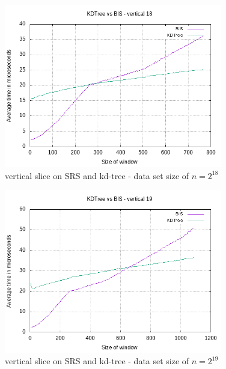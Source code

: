 \begin{figure}[h]
    \centering
    \includegraphics[width = 0.85\textwidth]{pictures/analysis/vert_18.png}
    \caption{vertical slice on SRS and kd-tree - data set size of $n=2^{18}$}\label{fig:vert_18}
\end{figure}

\begin{figure}[h]
    \centering
    \includegraphics[width = 0.85\textwidth]{pictures/analysis/vert_19.png}
    \caption{vertical slice on SRS and kd-tree - data set size of $n=2^{19}$}\label{fig:vert_19}
\end{figure}

